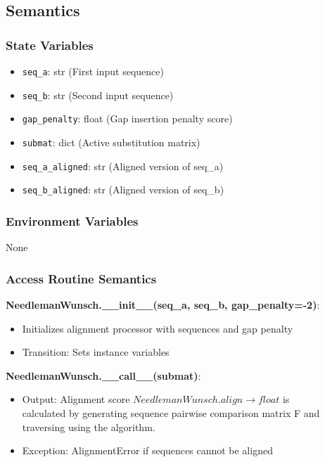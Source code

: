 \documentclass[12pt, titlepage]{article}
\begin{document}
\subsection{Semantics}

\subsubsection{State Variables}

\begin{itemize}
    \item \texttt{seq\_a}: str (First input sequence)
    \item \texttt{seq\_b}: str (Second input sequence)
    \item \texttt{gap\_penalty}: float (Gap insertion penalty score)
    \item \texttt{submat}: dict (Active substitution matrix)
    \item \texttt{seq\_a\_aligned}: str (Aligned version of seq\_a)
    \item \texttt{seq\_b\_aligned}: str (Aligned version of seq\_b)
\end{itemize}

\subsubsection{Environment Variables}

None


\subsubsection{Access Routine Semantics}

\noindent \textbf{NeedlemanWunsch.\_\_init\_\_(seq\_a, seq\_b, gap\_penalty=-2)}:
\begin{itemize}
    \item Initializes alignment processor with sequences and gap penalty
    \item Transition: Sets instance variables
\end{itemize}

\noindent \textbf{NeedlemanWunsch.\_\_call\_\_(submat)}:
\begin{itemize}
    \item Output: Alignment score $NeedlemanWunsch.align \rightarrow float$ is \\
    calculated by generating sequence pairwise comparison matrix F and traversing using the algorithm.
    \item Exception: AlignmentError if sequences cannot be aligned
\end{itemize}
\end{document}
